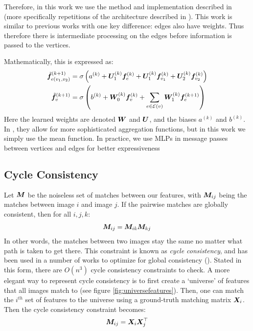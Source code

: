 \documentclass{article} %
\begin{document}
Therefore, in this work we use the method and implementation described in \cite{battaglia2018relational} (more specifically repetitions of the architecture described in \cite{battaglia2016interaction}).
This work is similar to previous works with one key difference: edges also have weights.
Thus therefore there is intermediate processing on the edges before information is passed to the vertices. 

Mathematically, this is expressed as: %
\begin{align}
\tilde{{\bm{f}}}_{e(v_1,v_2)}^{(k+1)} =&\; \sigma \left(a^{(k)} + {\bm{U}}_1^{(k)} {\bm{f}}_{e}^{(k)} + {\bm{U}}_1^{(k)} {\bm{f}}_{v_1}^{(k)} + {\bm{U}}_2^{(k)} {\bm{f}}_{v_2}^{(k)} \right) \\
\tilde{{\bm{f}}}_{v}^{(k+1)} =&\; \sigma\left(b^{(k)} + {\bm{W}}_0^{(k)} {\bm{f}}_{v}^{(k)} + \sum_{e \in \mathcal{E}(v)} {\bm{W}}_1^{(k)} {\bm{f}}_{e}^{(k+1)} \right) 
\end{align}
Here the learned weights are denoted ${\bm{W}}$ and ${\bm{U}}$, and the biases $a^{(k)}$ and  $b^{(k)}$.
In \cite{battaglia2018relational}, they allow for more sophisticated aggregation functions, but in this work we simply use the mean function.
In practice, we use MLPs in message passes between vertices and edges for better expressiveness


\subsection{Cycle Consistency}

Let ${\bm{M}}$ be the noiseless set of matches between our features, with ${\bm{M}}_{ij}$ being the matches between image $i$ and image $j$.
If the pairwise matches are globally consistent, then for all $i, j, k$:
\begin{equation}
{\bm{M}}_{ij} = {\bm{M}}_{ik} {\bm{M}}_{kj}
\label{eq:cycconsist1}
\end{equation}
In other words, the matches between two images stay the same no matter what path is taken to get there. 
This constraint is known as \textit{cycle consistency}, and has been used in a number of works to optimize for global consistency (\cite{zhou2015multi, wang2017multi, leonardos2016distributed}).
Stated in this form, there are $O(n^3)$ cycle consistency constraints to check.
A more elegant way to represent cycle consistency is to first create a `universe' of features that all images match to (see figure \ref{fig:universefeatures}).
Then, one can match the $i^{th}$ set of features to the universe using a ground-truth matching matrix ${\bm{X}}_i$.
Then the cycle consistency constraint becomes:
\begin{equation}
{\bm{M}}_{ij} = {\bm{X}}_{i}{\bm{X}}_{j}^\top
\label{eq:cycconsist2}
\end{equation}
\end{document}
